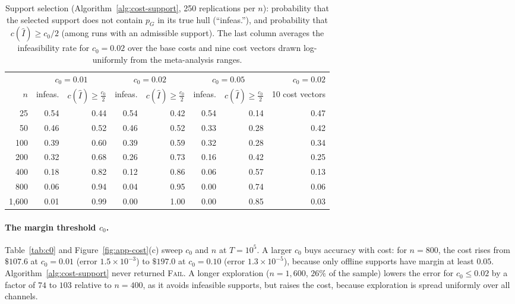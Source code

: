 \documentclass[twoside]{article}
\begin{document}
\begin{table}[!ht]
\caption{Support selection (Algorithm~\ref{alg:cost-support}, 250
replications per \(n\)): probability that the selected support does not
contain \(p_G\) in its true hull (``infeas.''), and probability that
\(c(\widehat I)\ge c_0/2\) (among runs with an admissible support). The
last column averages the infeasibility rate for \(c_0=0.02\) over the base
costs and nine cost vectors drawn log-uniformly from the meta-analysis
ranges.}
\label{tab:selection}
\centering\small
\begin{tabular}{r|rr|rr|rr|r}
\hline
 & \multicolumn{2}{c|}{\(c_0=0.01\)} & \multicolumn{2}{c|}{\(c_0=0.02\)} & \multicolumn{2}{c|}{\(c_0=0.05\)} & \(c_0=0.02\)\\
\(n\) & infeas. & \(c(\widehat I)\ge\frac{c_0}{2}\) & infeas. & \(c(\widehat I)\ge\frac{c_0}{2}\) & infeas. & \(c(\widehat I)\ge\frac{c_0}{2}\) & 10 cost vectors\\
\hline
25 & 0.54 & 0.44 & 0.54 & 0.42 & 0.54 & 0.14 & 0.47\\
50 & 0.46 & 0.52 & 0.46 & 0.52 & 0.33 & 0.28 & 0.42\\
100 & 0.39 & 0.60 & 0.39 & 0.59 & 0.32 & 0.28 & 0.34\\
200 & 0.32 & 0.68 & 0.26 & 0.73 & 0.16 & 0.42 & 0.25\\
400 & 0.18 & 0.82 & 0.12 & 0.86 & 0.06 & 0.57 & 0.13\\
800 & 0.06 & 0.94 & 0.04 & 0.95 & 0.00 & 0.74 & 0.06\\
1{,}600 & 0.01 & 0.99 & 0.00 & 1.00 & 0.00 & 0.85 & 0.03\\
\hline
\end{tabular}
\end{table}

\paragraph{The margin threshold \(c_0\).} Table~\ref{tab:c0} and
Figure~\ref{fig:app-cost}(c) sweep \(c_0\) and \(n\) at \(T=10^5\). A larger
\(c_0\) buys accuracy with cost: for \(n=800\), the cost rises from
\(\$107.6\) at \(c_0=0.01\) (error \(1.5\times10^{-3}\)) to \(\$197.0\) at
\(c_0=0.10\) (error \(1.3\times10^{-5}\)), because only offline supports
have margin at least \(0.05\). Algorithm~\ref{alg:cost-support} never
returned \textsc{Fail}. A longer exploration (\(n=1{,}600\), \(26\%\) of
the sample) lowers the error for \(c_0\le0.02\) by a factor of \(74\) to
\(103\) relative to \(n=400\), as it avoids infeasible supports, but raises
the cost, because exploration is spread uniformly over all channels.
\end{document}
